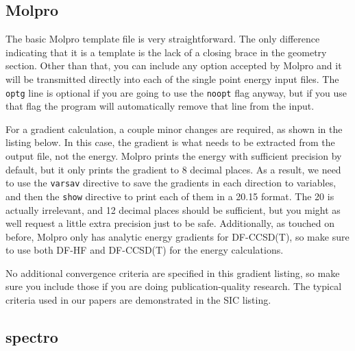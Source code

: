 \documentclass{article}
\begin{document}
\subsection{Molpro}

The basic Molpro template file is very straightforward. The only
difference indicating that it is a template is the lack of a closing
brace in the geometry section. Other than that, you can include any
option accepted by Molpro and it will be transmitted directly into
each of the single point energy input files. The \verb|optg| line is
optional if you are going to use the \verb|noopt| flag anyway, but if
you use that flag the program will automatically remove that line from
the input.



For a gradient calculation, a couple minor changes are required, as
shown in the listing below. In this case, the gradient is what needs
to be extracted from the output file, not the energy. Molpro prints
the energy with sufficient precision by default, but it only prints
the gradient to 8 decimal places. As a result, we need to use the
\verb|varsav| directive to save the gradients in each direction to
variables, and then the \verb|show| directive to print each of them in
a 20.15 format. The 20 is actually irrelevant, and 12 decimal places
should be sufficient, but you might as well request a little extra
precision just to be safe. Additionally, as touched on before, Molpro
only has analytic energy gradients for DF-CCSD(T), so make sure to use
both DF-HF and DF-CCSD(T) for the energy calculations.



No additional convergence criteria are specified in this gradient
listing, so make sure you include those if you are doing
publication-quality research. The typical criteria used in our papers
are demonstrated in the SIC listing.

\subsection{spectro}
\end{document}
